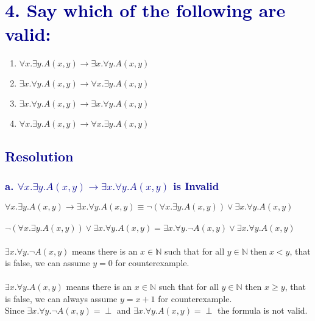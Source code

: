 \documentclass[12pt]{article}
\theoremstyle{definition}
\theoremstyle{plain}
\begin{document}
\section*{\textcolor{darkblue}{4. Say  which of the following are valid:}}
\begin{enumerate}[label=\alph*.]
\item $\forall x. \exists y.A(x,y) \rightarrow \exists x. \forall y.A(x,y)$
\item $\exists x. \forall y.A(x,y) \rightarrow \forall x. \exists y.A(x,y)$
\item $\exists x.\forall y.A(x,y) \rightarrow \exists x. \forall y.A(x,y)$
\item $\forall x.\exists y.A(x,y) \rightarrow \forall x.\exists y.A(x,y)$
\end{enumerate}
\subsection*{\textcolor{darkblue}{Resolution}}

\subsubsection*{\textcolor{darkblue}{a. $\forall x. \exists y.A(x,y) \rightarrow \exists x. \forall y.A(x,y)$ is Invalid}}
$\forall x. \exists y.A(x,y) \rightarrow \exists x. \forall y.A(x,y) \equiv \neg(\forall x. \exists y.A(x,y)) \vee \exists x. \forall y.A(x,y)$\\\\
$\neg(\forall x. \exists y.A(x,y)) \vee \exists x. \forall y.A(x,y) = \exists x. \forall y. \neg A(x,y) \vee \exists x. \forall y.A(x,y)$\\\\
$\exists x. \forall y.\neg A(x,y)$ means there is an $x \in \mathbb{N}$ such that for all $y \in \mathbb{N}\;\text{then} \;x<y$, that is false, we can assume $y = 0$ for counterexample.\\\\
$\exists x. \forall y.A(x,y)$ means there is an $x \in \mathbb{N}$ such that for all $y \in \mathbb{N}$ then $x \geq y$, that is false, we can always assume $y = x+ 1$ for counterexample.\\

Since $\exists x. \forall y.\neg A(x,y) = \perp$ and $\exists x. \forall y.A(x,y) = \perp$ the formula is not valid.
\end{document}
